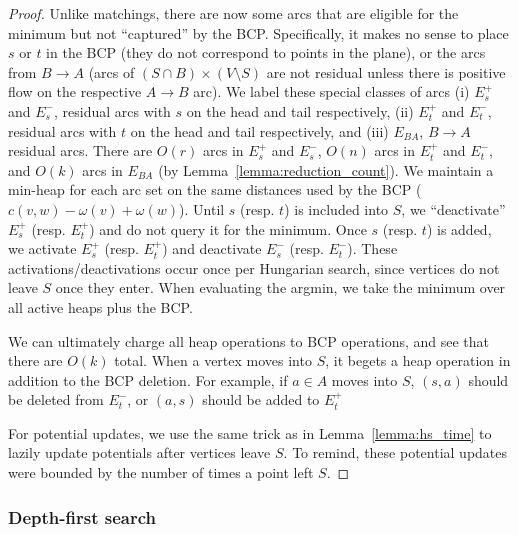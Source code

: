 \documentclass[11pt]{article}
\theoremstyle{plain}
\begin{document}
\begin{proof}
	Unlike matchings, there are now some arcs that are eligible for the 
	minimum but not ``captured'' by the BCP.
	Specifically, it makes no sense to place $s$ or $t$ in the BCP 
	(they do not correspond to points in the plane), or the arcs from 
	$B \to A$ (arcs of $(S \cap B) \times (V \setminus S)$ are not residual
	unless there is positive flow on the respective $A \to B$ arc).
	We label these special classes of arcs (i) $E_s^+$ and $E_s^-$, 
	residual arcs with $s$ on the head and tail respectively, (ii) 
	$E_t^+$ and $E_t^-$, residual arcs with $t$ on the head and tail 
	respectively, and (iii) $E_{BA}$, $B \to A$ residual arcs.
	There are $O(r)$ arcs in $E_s^+$ and $E_s^-$, $O(n)$ arcs in $E_t^+$ 
	and $E_t^-$, and $O(k)$ arcs in $E_{BA}$ 
	(by Lemma~\ref{lemma:reduction_count}).
	We maintain a min-heap for each arc set on the same distances used
	by the BCP ($c(v, w) - \omega(v) + \omega(w)$).
	Until $s$ (resp. $t$) is included into $S$, we ``deactivate'' $E_s^+$
	(resp. $E_t^+$) and do not query it for the minimum.
	Once $s$ (resp. $t$) is added, we activate $E_s^+$ (resp. $E_t^+$) and 
	deactivate $E_s^-$ (resp. $E_t^-$).
	These activations/deactivations occur once per Hungarian search, since
	vertices do not leave $S$ once they enter.
	When evaluating the argmin, we take the minimum over all active heaps
	plus the BCP.

	We can ultimately charge all heap operations to BCP operations, and
	see that there are $O(k)$ total.
	When a vertex moves into $S$, it begets a heap operation in addition 
	to the BCP deletion.
	For example, if $a \in A$ moves into $S$, $(s, a)$ should be deleted 
	from $E_t^-$, or $(a, s)$ should be added to $E_t^+$


	For potential updates, we use the same trick as in 
	Lemma~\ref{lemma:hs_time} to lazily update potentials after vertices
	leave $S$.
	To remind, these potential updates were bounded by the number of times
	a point left $S$.

\end{proof}


\subsubsection{Depth-first search}
\end{document}
